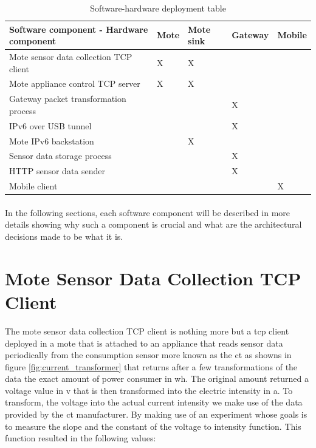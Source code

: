 \documentclass[oneside,12pt,a4paper,final]{book}
\begin{document}
\begin{table}
    \begin{tabular}{lllll}
    		  \hline
    Software component - Hardware component & Mote & Mote sink & Gateway & Mobile \\ \hline
    Mote sensor data collection TCP client  & X    & X         & ~       & ~      \\ 
    Mote appliance control TCP server       & X    & X         & ~       & ~      \\
    Gateway packet transformation process   & ~    & ~         & X       & ~      \\
    IPv6 over USB tunnel                    & ~    & ~         & X       & ~      \\
    Mote IPv6 backstation                   & ~    & X         & ~       & ~      \\
    Sensor data storage process             & ~    & ~         & X       & ~      \\
    HTTP sensor data sender                 & ~    & ~         & X       & ~      \\
    Mobile client                           & ~    & ~         & ~       & X      \\
    \end{tabular}
    \caption{Software-hardware deployment table}
    \label{table:soft_hard_deployment}
\end{table}
\paragraph{}
In the following sections, each software component will be described in more details showing why such a component is crucial and what are the architectural decisions made to be what it is.

\section{Mote Sensor Data Collection TCP Client}
The mote sensor data collection TCP client is nothing more but a \gls{tcp} client deployed in a mote that is attached to an appliance that reads sensor data periodically from the consumption sensor more known as the \gls{ct}  as showns in figure \ref{fig:current_transformer} that returns after a few transformations of the data the exact amount of power consumer in \gls{wh}. The original amount returned a voltage value in \gls{v} that is then transformed into the electric intensity in \gls{a}. To transform, the voltage into the actual current intensity we make use of the data provided by the \gls{ct} manufacturer. By making use of an experiment whose goals is to measure the slope and the constant of the voltage to intensity function. This function resulted in the following values:
\end{document}
